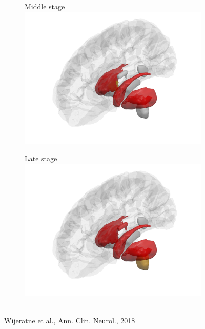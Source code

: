 \documentclass[10pt,xcolor=table,aspectratio=169]{beamer}
\begin{document}
\begin{frame}
\begin{figure}[htp]
\begin{subfigure}{0.2\textwidth}
\end{subfigure}
\begin{subfigure}{0.2\textwidth}
\centering
Middle stage
\includegraphics[width=1\textwidth,trim=70 0 70 0, clip]{images/ebmhd_pngs/subcortical_stage6.png}
\end{subfigure}
\begin{subfigure}{0.2\textwidth}
\centering
Late stage
\includegraphics[width=1\textwidth,trim=70 0 70 0, clip]{images/ebmhd_pngs/subcortical_stage10.png}
\end{subfigure}\\
Wijeratne et al., Ann. Clin. Neurol., 2018
\end{figure}
 
\end{frame}
\end{document}
